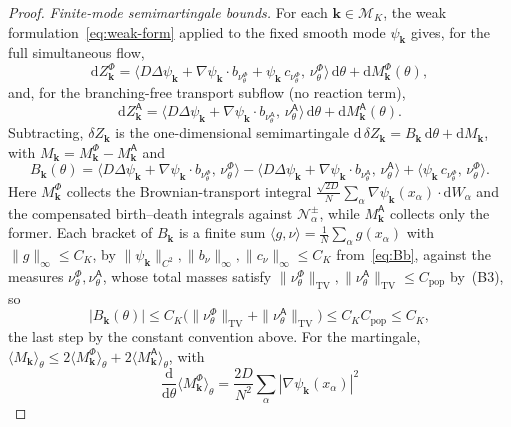 \documentclass[a4paper,fleqn]{cas-sc}
\theoremstyle{definition}
\theoremstyle{remark}
\begin{document}
\begin{proof}
\medskip
\noindent\emph{Finite-mode semimartingale bounds.}
For each $\mathbf k\in\mathcal M_K$, the weak
formulation~\eqref{eq:weak-form} applied to the fixed smooth mode $\psi_{\mathbf k}$ gives,
for the full simultaneous flow,
\[
\mathrm dZ^\Phi_{\mathbf k}
=\bigl\langle D\Delta\psi_{\mathbf k}+\nabla\psi_{\mathbf k}\!\cdot\! b_{\nu^\Phi_\theta}
   +\psi_{\mathbf k}\,c_{\nu^\Phi_\theta},\,\nu^\Phi_\theta\bigr\rangle\,\mathrm d\theta
 +\mathrm dM_{\mathbf k}^\Phi(\theta),
\]
and, for the branching-free transport subflow (no reaction term),
\[
\mathrm dZ^{\mathsf A}_{\mathbf k}
=\bigl\langle D\Delta\psi_{\mathbf k}+\nabla\psi_{\mathbf k}\!\cdot\! b_{\nu^{\mathsf A}_\theta},\,
   \nu^{\mathsf A}_\theta\bigr\rangle\,\mathrm d\theta+\mathrm dM_{\mathbf k}^{\mathsf A}(\theta).
\]
Subtracting, $\delta Z_{\mathbf k}$ is the one-dimensional semimartingale
$\mathrm d\,\delta Z_{\mathbf k}=B_{\mathbf k}\,\mathrm d\theta+\mathrm dM_{\mathbf k}$, with
$M_{\mathbf k}=M_{\mathbf k}^\Phi-M_{\mathbf k}^{\mathsf A}$ and
\[
B_{\mathbf k}(\theta)
=\bigl\langle D\Delta\psi_{\mathbf k}+\nabla\psi_{\mathbf k}\!\cdot\! b_{\nu^\Phi_\theta},\,\nu^\Phi_\theta\bigr\rangle
-\bigl\langle D\Delta\psi_{\mathbf k}+\nabla\psi_{\mathbf k}\!\cdot\! b_{\nu^{\mathsf A}_\theta},\,\nu^{\mathsf A}_\theta\bigr\rangle
+\bigl\langle\psi_{\mathbf k}\,c_{\nu^\Phi_\theta},\,\nu^\Phi_\theta\bigr\rangle .
\]
Here $M_{\mathbf k}^\Phi$ collects the Brownian-transport integral
$\tfrac{\sqrt{2D}}N\sum_\alpha\nabla\psi_{\mathbf k}(x_\alpha)\!\cdot\!\mathrm dW_\alpha$ and the
compensated birth--death integrals against $\mathcal N^\pm_\alpha$, while
$M_{\mathbf k}^{\mathsf A}$ collects only the former. Each bracket of $B_{\mathbf k}$ is a finite
sum $\langle g,\nu\rangle=\frac1N\sum_\alpha g(x_\alpha)$ with $\|g\|_\infty\le C_K$, by
$\|\psi_{\mathbf k}\|_{C^2},\|b_\nu\|_\infty,\|c_\nu\|_\infty\le C_K$ from~\eqref{eq:Bb},
against the measures $\nu^\Phi_\theta,\nu^{\mathsf A}_\theta$, whose total masses satisfy
$\|\nu^\Phi_\theta\|_{\mathrm{TV}},\|\nu^{\mathsf A}_\theta\|_{\mathrm{TV}}\le C_{\mathrm{pop}}$ by~(B3), so
\[
|B_{\mathbf k}(\theta)|
\le C_K\bigl(\|\nu^\Phi_\theta\|_{\mathrm{TV}}+\|\nu^{\mathsf A}_\theta\|_{\mathrm{TV}}\bigr)
\le C_KC_{\mathrm{pop}} \leq C_K,
\]
the last step by the constant convention above.
For the martingale, $\langle M_{\mathbf k}\rangle_\theta\le2\langle M_{\mathbf k}^\Phi\rangle_\theta+2\langle M_{\mathbf k}^{\mathsf A}\rangle_\theta$, with
\[
\frac{\mathrm d}{\mathrm d\theta}\langle M_{\mathbf k}^\Phi\rangle_\theta
=\frac{2D}{N^2}\sum_\alpha|\nabla\psi_{\mathbf k}(x_\alpha)|^2
\]
\end{proof}
\end{document}
